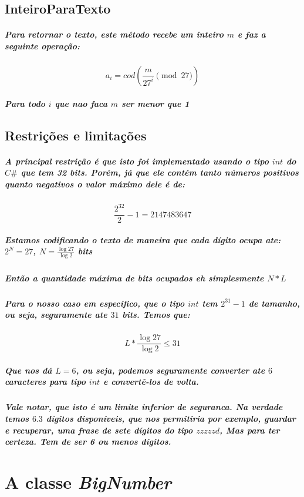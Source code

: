 \documentclass[12pt,twoside, a4paper, twocolumn]{article}
\begin{document}
\subsection{InteiroParaTexto}

\subparagraph*{Para retornar o texto, este método recebe um inteiro $m$ e faz a seguinte operação:}

\begin{equation}
    a_i    = cod\left(\frac{m}{27^i} \pmod{27}\right)
\end{equation}

\subparagraph*{Para todo $i$ que nao faca $m$ ser menor que 1}

\subsection{Restrições e limitações}

\subparagraph*{A principal restrição é que isto foi implementado usando o tipo $int$ do $C\#$ que tem 32 bits. Porém, já que ele contém tanto números positivos quanto negativos o valor máximo dele é de:}

\begin{equation}
    \frac{2^{32}}{2} - 1 = 2147483647
\end{equation}

\subparagraph*{Estamos codificando o texto de maneira que cada dígito ocupa ate: $2^N = 27$, $N = \frac{\log{27}}{\log{2}}$ bits}

\subparagraph*{Então a quantidade máxima de bits ocupados eh simplesmente $N*L$}

\subparagraph*{Para o nosso caso em específico, que o tipo $int$ tem $2^{31} -1$ de tamanho, ou seja, seguramente ate $31$ bits. Temos que:}

\begin{equation}
    L * \frac{\log{27}}{\log{2}} \le 31
\end{equation}

\subparagraph*{Que nos dá $L = 6$, ou seja, podemos seguramente converter ate $6$ caracteres para tipo $int$ e convertê-los de volta.
}

\subparagraph*{Vale notar, que isto é um limite inferior de seguranca. Na verdade temos $6.3$ dígitos disponíveis, que nos permitiria por exemplo, guardar e recuperar, uma frase de sete dígitos do tipo $zzzzzd$, Mas para ter certeza. Tem de ser 6 ou menos dígitos.}

\section{A classe \emph{BigNumber}}
\end{document}
